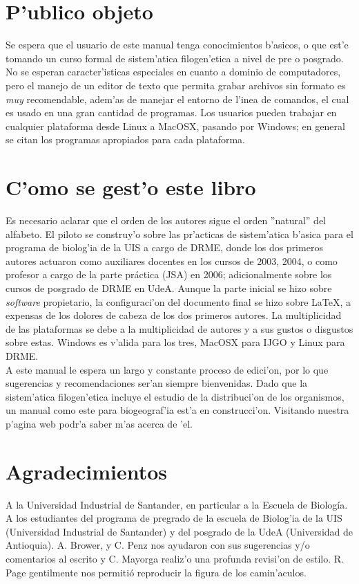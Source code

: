 \section*{P'ublico objeto}
Se espera que el usuario de este manual tenga conocimientos b'asicos, o que est'e tomando un curso formal de sistem'atica filogen'etica a nivel de pre o posgrado. No se esperan caracter'isticas especiales en cuanto a dominio de computadores, pero el manejo de un editor de texto que permita grabar archivos sin formato es \emph{muy} recomendable, adem'as de manejar el entorno de l'inea de comandos, el cual es usado en una gran cantidad de programas. Los usuarios pueden trabajar en cualquier plataforma desde Linux a MacOSX, pasando por Windows; en general se citan los programas apropiados para cada plataforma.
\section*{C'omo se gest'o este libro}
Es necesario aclarar que el orden de los autores sigue el orden ''natural'' del alfabeto. El piloto se construy'o sobre las pr'acticas de sistem'atica b'asica para el programa de biolog'ia de la UIS a cargo de DRME, donde los dos primeros autores actuaron como auxiliares docentes en los cursos de 2003, 2004, o como profesor a cargo de la parte pr\'actica (JSA) en 2006; adicionalmente sobre los cursos de posgrado de DRME en UdeA. Aunque la parte inicial se hizo sobre \textit{software} propietario, la configuraci'on del documento final se hizo sobre \LaTeX, a expensas de los dolores de cabeza de los dos primeros autores. La multiplicidad de las plataformas se debe a la multiplicidad de autores y a sus gustos o disgustos sobre estas. Windows es v'alida para los tres, MacOSX para IJGO y Linux para DRME.\\
A este manual le espera un largo y constante proceso de edici'on, por lo que sugerencias y recomendaciones ser'an siempre bienvenidas. Dado que la sistem'atica filogen'etica incluye el estudio de la distribuci'on de los organismos, un manual como este para biogeograf'ia est'a en construcci'on. Visitando nuestra p'agina web podr'a saber m'as acerca de 'el.
\section*{Agradecimientos}
A la Universidad Industrial de Santander, en particular a la Escuela de Biolog\'ia. A los estudiantes del programa de pregrado de la escuela de Biolog'ia de la UIS (Universidad Industrial de Santander) y del posgrado de la UdeA (Universidad de Antioquia). A. Brower, y C. Penz nos ayudaron con sus sugerencias y/o comentarios al escrito y C. Mayorga realiz'o una profunda revisi'on de estilo. R. Page gentilmente nos permiti\'o reproducir la figura de los camin'aculos.